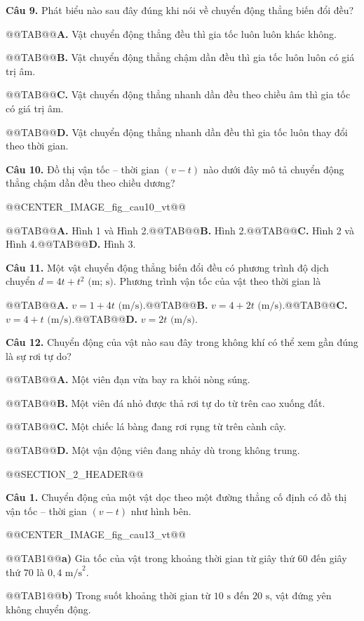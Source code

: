 \documentclass{article}
\begin{document}
\textbf{Câu 9.} Phát biểu nào sau đây đúng khi nói về chuyển động thẳng biến đổi đều?

@@TAB@@\textbf{A.} Vật chuyển động thẳng đều thì gia tốc luôn luôn khác không.

@@TAB@@\textbf{B.} Vật chuyển động thẳng chậm dần đều thì gia tốc luôn luôn có giá trị âm.

@@TAB@@\textbf{C.} Vật chuyển động thẳng nhanh dần đều theo chiều âm thì gia tốc có giá trị âm.

@@TAB@@\textbf{D.} Vật chuyển động thẳng nhanh dần đều thì gia tốc luôn thay đổi theo thời gian.

\textbf{Câu 10.} Đồ thị vận tốc -- thời gian $(v - t)$ nào dưới đây mô tả chuyển động thẳng chậm dần đều theo chiều dương?

@@CENTER_IMAGE_fig_cau10_vt@@

@@TAB@@\textbf{A.} Hình 1 và Hình 2.@@TAB@@\textbf{B.} Hình 2.@@TAB@@\textbf{C.} Hình 2 và Hình 4.@@TAB@@\textbf{D.} Hình 3.

\textbf{Câu 11.} Một vật chuyển động thẳng biến đổi đều có phương trình độ dịch chuyển $d = 4t + t^2\text{ (m; s)}$. Phương trình vận tốc của vật theo thời gian là

@@TAB@@\textbf{A.} $v = 1 + 4t\text{ (m/s)}$.@@TAB@@\textbf{B.} $v = 4 + 2t\text{ (m/s)}$.@@TAB@@\textbf{C.} $v = 4 + t\text{ (m/s)}$.@@TAB@@\textbf{D.} $v = 2t\text{ (m/s)}$.

\textbf{Câu 12.} Chuyển động của vật nào sau đây trong không khí có thể xem gần đúng là sự rơi tự do?

@@TAB@@\textbf{A.} Một viên đạn vừa bay ra khỏi nòng súng.

@@TAB@@\textbf{B.} Một viên đá nhỏ được thả rơi tự do từ trên cao xuống đất.

@@TAB@@\textbf{C.} Một chiếc lá bàng đang rơi rụng từ trên cành cây.

@@TAB@@\textbf{D.} Một vận động viên đang nhảy dù trong không trung.

@@SECTION_2_HEADER@@

\textbf{Câu 1.} Chuyển động của một vật dọc theo một đường thẳng cố định có đồ thị vận tốc -- thời gian $(v - t)$ như hình bên.

@@CENTER_IMAGE_fig_cau13_vt@@

@@TAB1@@\textbf{a)} Gia tốc của vật trong khoảng thời gian từ giây thứ $60$ đến giây thứ $70$ là $0{,}4\text{ m/s}^2$.

@@TAB1@@\textbf{b)} Trong suốt khoảng thời gian từ $10\text{ s}$ đến $20\text{ s}$, vật đứng yên không chuyển động.
\end{document}
